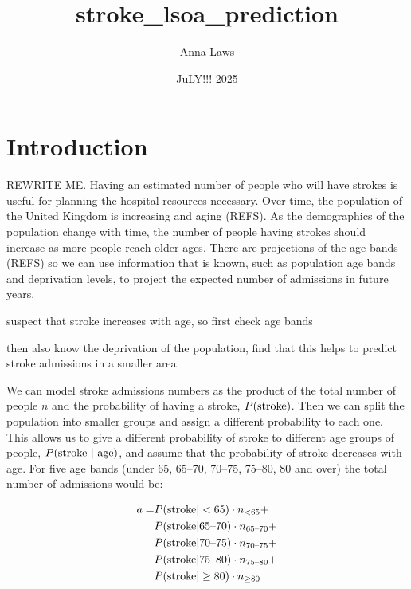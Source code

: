 \documentclass[12pt]{extarticle}
\title{stroke\_lsoa\_prediction}
\author{Anna Laws}
\date{JuLY!!! 2025}
\begin{document}
\maketitle



\section{Introduction}

REWRITE ME.
Having an estimated number of people who will have strokes is useful for planning the hospital resources necessary.
% 
Over time, the population of the United Kingdom is increasing and aging (REFS).
As the demographics of the population change with time, the number of people having strokes should increase as more people reach older ages.
% 
There are projections of the age bands (REFS) so we can use information that is known, such as population age bands and deprivation levels, to project the expected number of admissions in future years.

suspect that stroke increases with age, so first check age bands

then also know the deprivation of the population, find that this helps to predict stroke admissions in a smaller area


We can model stroke admissions numbers as the product of the total number of people $n$ and the probability of having a stroke, $P(\textnormal{stroke})$. Then we can split the population into smaller groups and assign a different probability to each one. This allows us to give a different probability of stroke to different age groups of people, $P(\textnormal{stroke | age})$, and assume that the probability of stroke decreases with age. For five age bands (under 65, 65--70, 70--75, 75--80, 80 and over) the total number of admissions would be:

\begin{equation}
\begin{split}
    a = &P(\textnormal{stroke} | <65) \cdot n_{<65} +\\
    &P(\textnormal{stroke} | 65\textnormal{--}70) \cdot n_{65\textnormal{--}70} +\\
    &P(\textnormal{stroke} | 70\textnormal{--}75) \cdot n_{70\textnormal{--}75} +\\
    &P(\textnormal{stroke} | 75\textnormal{--}80) \cdot n_{75\textnormal{--}80} +\\
    &P(\textnormal{stroke} | \geq80) \cdot n_{\geq80}
\end{split}
\end{equation}
\end{document}
